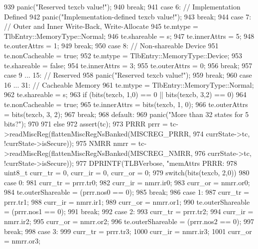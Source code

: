 \begin{DoxyCode}
{{{939             panic("Reserved texcb value!\n");
940             break;
941           case 6: // Implementation Defined
942             panic("Implementation-defined texcb value!\n");
943             break;
944           case 7: // Outer and Inner Write-Back, Write-Allocate
945             te.mtype = TlbEntry::MemoryType::Normal;
946             te.shareable = s;
947             te.innerAttrs = 5;
948             te.outerAttrs = 1;
949             break;
950           case 8: // Non-shareable Device
951             te.nonCacheable = true;
952             te.mtype = TlbEntry::MemoryType::Device;
953             te.shareable = false;
954             te.innerAttrs = 3;
955             te.outerAttrs = 0;
956             break;
957           case 9 ... 15:  // Reserved
958             panic("Reserved texcb value!\n");
959             break;
960           case 16 ... 31: // Cacheable Memory
961             te.mtype = TlbEntry::MemoryType::Normal;
962             te.shareable = s;
963             if (bits(texcb, 1,0) == 0 || bits(texcb, 3,2) == 0)
964                 te.nonCacheable = true;
965             te.innerAttrs = bits(texcb, 1, 0);
966             te.outerAttrs = bits(texcb, 3, 2);
967             break;
968           default:
969             panic("More than 32 states for 5 bits?\n");
970         }
971     } else {
972         assert(tc);
973         PRRR prrr = tc->readMiscReg(flattenMiscRegNsBanked(MISCREG_PRRR,
974                                     currState->tc, !currState->isSecure));
975         NMRR nmrr = tc->readMiscReg(flattenMiscRegNsBanked(MISCREG_NMRR,
976                                     currState->tc, !currState->isSecure));
977         DPRINTF(TLBVerbose, "memAttrs PRRR:%
978         uint8_t curr_tr = 0, curr_ir = 0, curr_or = 0;
979         switch(bits(texcb, 2,0)) {
980           case 0:
981             curr_tr = prrr.tr0;
982             curr_ir = nmrr.ir0;
983             curr_or = nmrr.or0;
984             te.outerShareable = (prrr.nos0 == 0);
985             break;
986           case 1:
987             curr_tr = prrr.tr1;
988             curr_ir = nmrr.ir1;
989             curr_or = nmrr.or1;
990             te.outerShareable = (prrr.nos1 == 0);
991             break;
992           case 2:
993             curr_tr = prrr.tr2;
994             curr_ir = nmrr.ir2;
995             curr_or = nmrr.or2;
996             te.outerShareable = (prrr.nos2 == 0);
997             break;
998           case 3:
999             curr_tr = prrr.tr3;
1000             curr_ir = nmrr.ir3;
1001             curr_or = nmrr.or3;
}}}
\end{DoxyCode}
